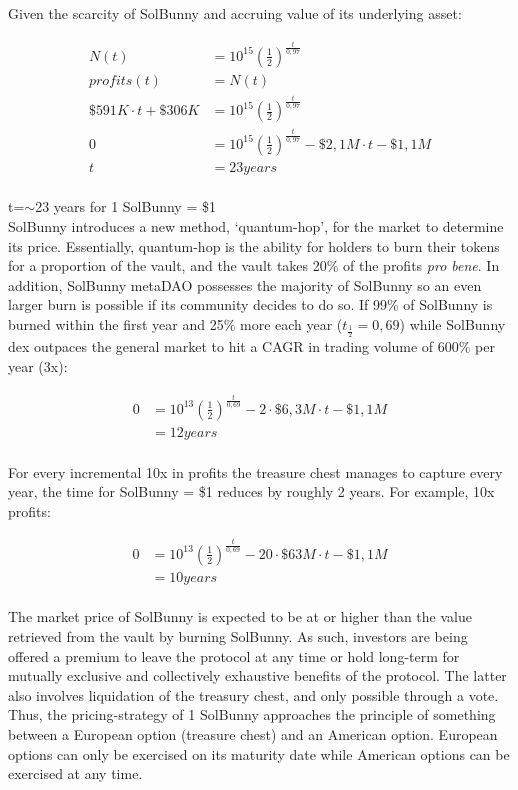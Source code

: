 \documentclass[12pt]{article}
\begin{document}
Given the scarcity of SolBunny and accruing value of its underlying asset:

\begin{equation}\label{target}
\begin{split}
N(t) &=10^{15}(\frac{1}{2})^\frac{t}{0,97}\\
profits(t) &=N(t)\\
\$591K \cdot t+ \$306K&=10^{15}(\frac{1}{2})^\frac{t}{0,97}\\
0 &=10^{15}(\frac{1}{2})^\frac{t}{0,97}-\$2,1M \cdot t-\$1,1M\\
t &= 23years
\end{split}
\end{equation}
\\

t=$\sim$23 years for 1 SolBunny = \$1\\
SolBunny introduces a new method, ‘quantum-hop’, for the market to determine its price. Essentially, quantum-hop is the ability for holders to burn their tokens for a proportion of the vault, and the vault takes 20\% of the profits \textit{pro bene}. In addition, SolBunny metaDAO possesses the majority of SolBunny so an even larger burn is possible if its community decides to do so. If 99\% of SolBunny is burned within the first year and 25\% more each year ($t_{\frac{1}{2}}=0,69$) while SolBunny dex outpaces the general market to hit a CAGR in trading volume of 600\% per year (3x):

\begin{equation}\label{2x}
\begin{split}
0 &=10^{13}(\frac{1}{2})^\frac{t}{0,69} - 2 \cdot \$6,3M \cdot t-\$1,1M\\
 &= 12years
\end{split}
\end{equation}
\\

For every incremental 10x in profits the treasure chest manages to capture every year, the time for SolBunny = \$1 reduces by roughly 2 years. For example, 10x profits:

\begin{equation}\label{10x}
\begin{split}
0 &=10^{13}(\frac{1}{2})^\frac{t}{0,69} - 20 \cdot \$63M \cdot t-\$1,1M\\
&= 10years
\end{split}
\end{equation}
\\
The market price of SolBunny is expected to be at or higher than the value retrieved from the vault by burning SolBunny. As such, investors are being offered a premium to leave the protocol at any time or hold long-term for mutually exclusive and collectively exhaustive benefits of the protocol. The latter also involves liquidation of the treasury chest, and only possible through a vote. Thus, the pricing-strategy of 1 SolBunny approaches the principle of something between a European option (treasure chest) and an American option. European options can only be exercised on its maturity date while American options can be exercised at any time.
\end{document}
